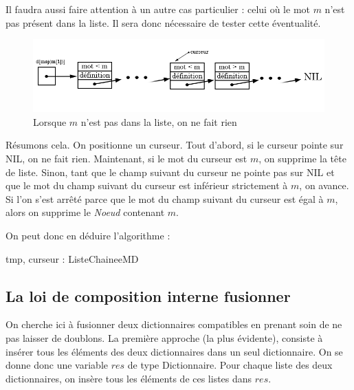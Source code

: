 \documentclass[a4paper, titlepage]{livret} %
\begin{document}
					Il faudra aussi faire attention à un autre cas particulier : celui où le mot $m$ n'est pas présent dans la liste.
					Il sera donc nécessaire de tester cette éventualité.
					\begin{figure}[!ht]
					\centering
  						\includegraphics[scale=0.45]{supprimer3.png}
  						\caption{Lorsque $m$ n'est pas dans la liste, on ne fait rien} 
					\end{figure}

					Résumons cela.
					On positionne un curseur.
					Tout d'abord, si le curseur pointe sur NIL, on ne fait rien. 
					Maintenant, si le mot du curseur est $m$, on supprime la tête de liste.
					Sinon, tant que le champ suivant du curseur ne pointe pas sur NIL et que le mot du champ suivant du curseur est inférieur strictement à $m$, on avance.
					Si l'on s'est arrêté parce que le mot du champ suivant du curseur est égal à $m$, alors on supprime le \textit{Noeud} contenant $m$.

					On peut donc en déduire l'algorithme :\\
					\begin{algorithme}
						{tmp, curseur : ListeChaineeMD}{
						}
					\end{algorithme}
			
			\subsection{La loi de composition interne fusionner}
				On cherche ici à fusionner deux dictionnaires \og compatibles \fg{} en prenant soin de ne pas laisser de doublons.
				La première approche (la plus évidente), consiste à insérer tous les éléments des deux dictionnaires dans un seul dictionnaire.
				On se donne donc une variable $res$ de type Dictionnaire.
				Pour chaque liste des deux dictionnaires, on insère tous les éléments de ces listes dans $res$.
\end{document}
